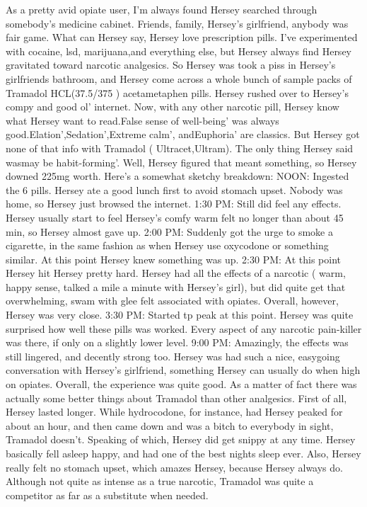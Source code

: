 \documentclass[12pt]{book}
\begin{document}
As a pretty avid opiate user, I'm always found Hersey searched through somebody's medicine cabinet. Friends, family, Hersey's girlfriend, anybody was fair game. What can Hersey say, Hersey love prescription pills. I've experimented with cocaine, lsd, marijuana,and everything else, but Hersey always find Hersey gravitated toward narcotic analgesics. So Hersey was took a piss in Hersey's girlfriends bathroom, and Hersey come across a whole bunch of sample packs of Tramadol HCL(37.5/375 ) acetametaphen pills. Hersey rushed over to Hersey's compy and good ol' internet. Now, with any other narcotic pill, Hersey know what Hersey want to read.False sense of well-being' was always good.Elation',Sedation',Extreme calm', andEuphoria' are classics. But Hersey got none of that info with Tramadol ( Ultracet,Ultram). The only thing Hersey said wasmay be habit-forming'. Well, Hersey figured that meant something, so Hersey downed 225mg worth. Here's a somewhat sketchy breakdown: NOON: Ingested the 6 pills. Hersey ate a good lunch first to avoid stomach upset. Nobody was home, so Hersey just browsed the internet. 1:30 PM: Still did feel any effects. Hersey usually start to feel Hersey's comfy warm felt no longer than about 45 min, so Hersey almost gave up. 2:00 PM: Suddenly got the urge to smoke a cigarette, in the same fashion as when Hersey use oxycodone or something similar. At this point Hersey knew something was up. 2:30 PM: At this point Hersey hit Hersey pretty hard. Hersey had all the effects of a narcotic ( warm, happy sense, talked a mile a minute with Hersey's girl), but did quite get that overwhelming, swam with glee felt associated with opiates. Overall, however, Hersey was very close. 3:30 PM: Started tp peak at this point. Hersey was quite surprised how well these pills was worked. Every aspect of any narcotic pain-killer was there, if only on a slightly lower level. 9:00 PM: Amazingly, the effects was still lingered, and decently strong too. Hersey was had such a nice, easygoing conversation with Hersey's girlfriend, something Hersey can usually do when high on opiates. Overall, the experience was quite good. As a matter of fact there was actually some better things about Tramadol than other analgesics. First of all, Hersey lasted longer. While hydrocodone, for instance, had Hersey peaked for about an hour, and then came down and was a bitch to everybody in sight, Tramadol doesn't. Speaking of which, Hersey did get snippy at any time. Hersey basically fell asleep happy, and had one of the best nights sleep ever. Also, Hersey really felt no stomach upset, which amazes Hersey, because Hersey always do. Although not quite as intense as a true narcotic, Tramadol was quite a competitor as far as a substitute when needed.
\end{document}
